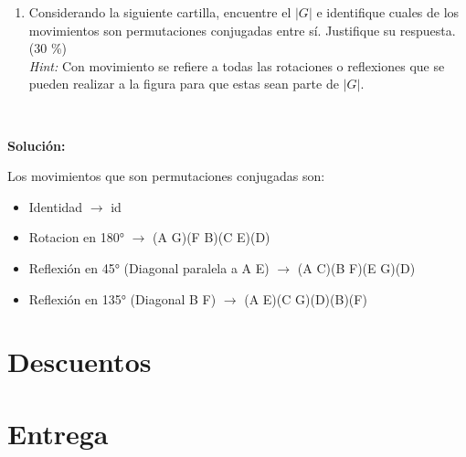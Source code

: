 \documentclass[letterpaper,10pt]{article}
\begin{document}
\begin{enumerate}
    
    \item Considerando la siguiente cartilla, encuentre el $|G|$ e identifique cuales de los movimientos son permutaciones conjugadas entre sí. Justifique su respuesta. (30 \%)
    \\
    \textit{Hint:} Con movimiento se refiere a todas las rotaciones o reflexiones que se pueden realizar a la figura para que estas sean parte de  $|G|$.
    
    
\centering
 \\
\label{cartilla}
    
\end{enumerate}

\textbf{Solución:}
    \vspace{1cm}

Los movimientos que son permutaciones conjugadas son:
\begin{itemize}
    \item Identidad $\rightarrow$ id
    \item Rotacion en 180° $\rightarrow$ (A G)(F B)(C E)(D)
    \item Reflexión en 45° (Diagonal paralela a A E) $\rightarrow$ (A C)(B F)(E G)(D)
    \item Reflexión en 135° (Diagonal B F) $\rightarrow$ (A E)(C G)(D)(B)(F)
\end{itemize}


\section{Descuentos}


\section{Entrega}

\end{document}
